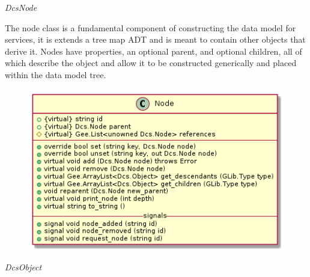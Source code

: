       \emph{DcsNode}

      \vspace*{-0.75cm}
      \begin{minipage}[t]{0.5\textwidth}
        \vspace*{0.5cm}
        The node class is a fundamental component of constructing the data model
        for services, it is extends a tree map ADT and is meant to contain other
        objects that derive it. Nodes have properties, an optional parent, and
        optional children, all of which describe the object and allow it to be
        constructed generically and placed within the data model tree.
      \end{minipage} \hfill
      \begin{minipage}[t]{0.45\textwidth}
        \begin{figure}[H]
          \includegraphics[width=\textwidth]{figures/design/class/core/node}
          \label{fig:dsg-classes-node}
        \end{figure}
      \end{minipage}

      \emph{DcsObject}

